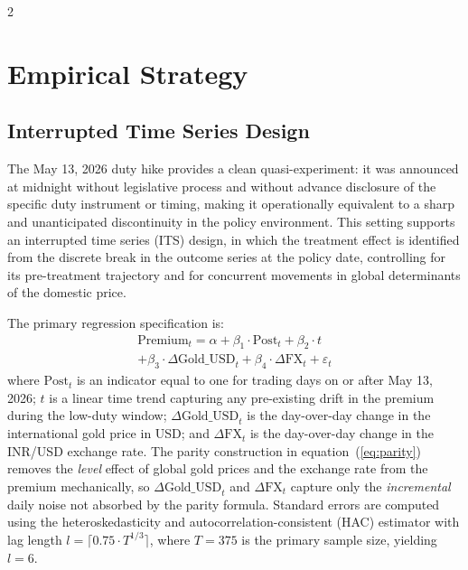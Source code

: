 \documentclass[12pt]{article}
\begin{document}
\vspace{0.5em}
\begin{multicols}{2}

\section{Empirical Strategy}
\label{sec:strategy}

\subsection*{Interrupted Time Series Design}

The May 13, 2026 duty hike provides a clean quasi-experiment: it was announced at midnight without legislative process and without advance disclosure of the specific duty instrument or timing, making it operationally equivalent to a sharp and unanticipated discontinuity in the policy environment. This setting supports an interrupted time series (ITS) design, in which the treatment effect is identified from the discrete break in the outcome series at the policy date, controlling for its pre-treatment trajectory and for concurrent movements in global determinants of the domestic price.

The primary regression specification is:
\begin{equation}
\begin{split}
\text{Premium}_t = \alpha + \beta_1 \cdot \text{Post}_t + \beta_2 \cdot t \\
+ \beta_3 \cdot \Delta\text{Gold\_USD}_t + \beta_4 \cdot \Delta\text{FX}_t + \varepsilon_t
\end{split}
\label{eq:its}
\end{equation}
where $\text{Post}_t$ is an indicator equal to one for trading days on or after May 13, 2026; $t$ is a linear time trend capturing any pre-existing drift in the premium during the low-duty window; $\Delta\text{Gold\_USD}_t$ is the day-over-day change in the international gold price in USD; and $\Delta\text{FX}_t$ is the day-over-day change in the INR/USD exchange rate. The parity construction in equation~(\ref{eq:parity}) removes the \emph{level} effect of global gold prices and the exchange rate from the premium mechanically, so $\Delta\text{Gold\_USD}_t$ and $\Delta\text{FX}_t$ capture only the \emph{incremental} daily noise not absorbed by the parity formula. Standard errors are computed using the \citet{Newey1987} heteroskedasticity and autocorrelation-consistent (HAC) estimator with lag length $l = \lceil 0.75 \cdot T^{1/3} \rceil$, where $T = 375$ is the primary sample size, yielding $l = 6$.


\end{multicols}
\end{document}
